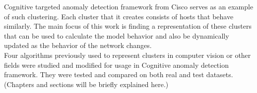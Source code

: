 \documentclass[thesis=B,english]{FITthesis}[2012/10/20]
\begin{document}
Cognitive targeted anomaly detection framework from Cisco serves as an example of such clustering.
Each cluster that it creates consists of hosts that behave similarly.
The main focus of this work is finding a representation of these clusters that can be used to calculate the model behavior and also be dynamically updated as the behavior of the network changes. \\

Four algorithms previously used to represent clusters in computer vision or other fields were studied and modified for usage in Cognitive anomaly detection framework.
They were tested and compared on both real and test datasets. \\

(Chapters and sections will be briefly explained here.)

%

%
\end{document}
